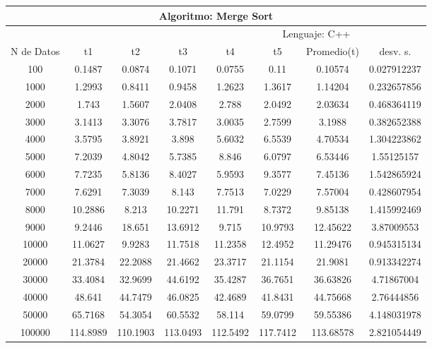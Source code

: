 \documentclass{article}
\begin{document}
    \begin{table}[]
        \begin{tabular}{|c|c|c|c|c|c|c|c| }
            \hline
            \multicolumn{8}{|c|}{Algoritmo: Merge Sort} \\ \hline
            \multicolumn{4}{|c|}{} & \multicolumn{4}{c|}{Lenguaje: C++} \\ \hline
              N de Datos &     t1    &  t2         &  t3          &   t4        &    t5     &   Promedio(t)       & desv. s. \\ \hline
                100	    &0.1487	&0.0874	&0.1071	&0.0755	&0.11	&0.10574	&0.027912237\\ \hline
                1000	&1.2993	&0.8411	&0.9458	&1.2623	&1.3617	&1.14204	&0.232657856\\ \hline
                2000	&1.743	&1.5607	&2.0408	&2.788	&2.0492	&2.03634	&0.468364119\\ \hline
                3000	&3.1413	&3.3076	&3.7817	&3.0035	&2.7599	&3.1988	&0.382652388\\ \hline
                4000	&3.5795	&3.8921	&3.898	&5.6032	&6.5539	&4.70534	&1.304223862\\ \hline
                5000	&7.2039	&4.8042	&5.7385	&8.846	&6.0797	&6.53446	&1.55125157\\ \hline
                6000	&7.7235	&5.8136	&8.4027	&5.9593	&9.3577	&7.45136	&1.542865924\\ \hline
                7000	&7.6291	&7.3039	&8.143	&7.7513	&7.0229	&7.57004	&0.428607954\\ \hline
                8000	&10.2886	&8.213	&10.2271	&11.791	&8.7372	&9.85138	&1.415992469\\ \hline
                9000	&9.2446	&18.651	&13.6912	&9.715	&10.9793	&12.45622	&3.87009553\\ \hline
                10000	&11.0627	&9.9283	&11.7518	&11.2358	&12.4952	&11.29476	&0.945315134\\ \hline
                20000	&21.3784	&22.2088	&21.4662	&23.3717	&21.1154	&21.9081	&0.913342274\\ \hline
                30000	&33.4084	&32.9699	&44.6192	&35.4287	&36.7651	&36.63826	&4.71867004\\ \hline
                40000	&48.641	&44.7479	&46.0825	&42.4689	&41.8431	&44.75668	&2.76444856\\ \hline
                50000	&65.7168	&54.3054	&60.5532	&58.114	&59.0799	&59.55386	&4.148031978\\ \hline
                100000	&114.8989	&110.1903	&113.0493	&112.5492	&117.7412	&113.68578	&2.821054449\\ \hline

\end{tabular}
\end{table}
\end{document}
